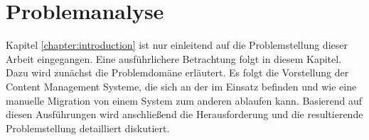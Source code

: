 \chapter{Problemanalyse}
    Kapitel \ref{chapter:introduction} ist nur einleitend
    auf die Problemstellung dieser Arbeit eingegangen.
    Eine ausführlichere Betrachtung folgt in diesem Kapitel.
    Dazu wird zunächst die Problemdomäne erläutert.
    Es folgt die Vorstellung der Content Management Systeme,
    die sich an der {\fernUni} im Einsatz befinden
    und wie eine manuelle Migration von einem System zum anderen
    ablaufen kann.
    Basierend auf diesen Ausführungen wird anschließend
    die Herausforderung und die resultierende Problemstellung
    detailliert diskutiert.

    \label{chapter:ProblemAnalysis}
    
    
    
    
    
